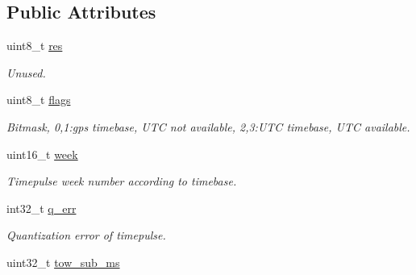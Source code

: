 \subsection*{Public Attributes}
\begin{DoxyCompactItemize}
\item 
\hypertarget{structubx__tim__tp__t_ad7c5e48f09cc53c245d180c3e7ec61d1}{uint8\+\_\+t \hyperlink{structubx__tim__tp__t_ad7c5e48f09cc53c245d180c3e7ec61d1}{res}}\label{structubx__tim__tp__t_ad7c5e48f09cc53c245d180c3e7ec61d1}

\begin{DoxyCompactList}\small\item\em Unused. \end{DoxyCompactList}\item 
\hypertarget{structubx__tim__tp__t_a1431a643f29c275ffa684c85ac5ba97a}{uint8\+\_\+t \hyperlink{structubx__tim__tp__t_a1431a643f29c275ffa684c85ac5ba97a}{flags}}\label{structubx__tim__tp__t_a1431a643f29c275ffa684c85ac5ba97a}

\begin{DoxyCompactList}\small\item\em Bitmask, 0,1\+:gps timebase, U\+T\+C not available, 2,3\+:U\+T\+C timebase, U\+T\+C available. \end{DoxyCompactList}\item 
\hypertarget{structubx__tim__tp__t_ab114d02e8cb625cfad8cb6b13ade9c76}{uint16\+\_\+t \hyperlink{structubx__tim__tp__t_ab114d02e8cb625cfad8cb6b13ade9c76}{week}}\label{structubx__tim__tp__t_ab114d02e8cb625cfad8cb6b13ade9c76}

\begin{DoxyCompactList}\small\item\em Timepulse week number according to timebase. \end{DoxyCompactList}\item 
\hypertarget{structubx__tim__tp__t_ad403a5693f9de93b8ea3e01fe8528575}{int32\+\_\+t \hyperlink{structubx__tim__tp__t_ad403a5693f9de93b8ea3e01fe8528575}{q\+\_\+err}}\label{structubx__tim__tp__t_ad403a5693f9de93b8ea3e01fe8528575}

\begin{DoxyCompactList}\small\item\em Quantization error of timepulse. \end{DoxyCompactList}\item 
\hypertarget{structubx__tim__tp__t_a4bdc1cf8610c61a1442f53f733f822eb}{uint32\+\_\+t \hyperlink{structubx__tim__tp__t_a4bdc1cf8610c61a1442f53f733f822eb}{tow\+\_\+sub\+\_\+ms}}\label{structubx__tim__tp__t_a4bdc1cf8610c61a1442f53f733f822eb}


\end{DoxyCompactItemize}
